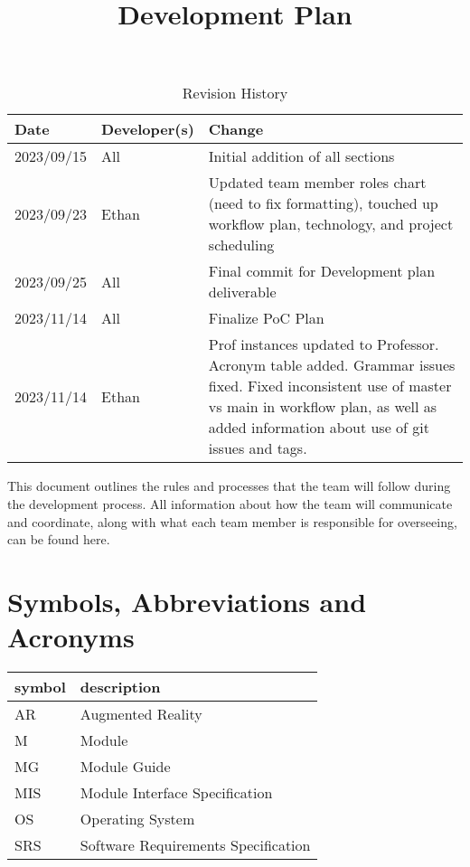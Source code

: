 \documentclass{article}
\title{Development Plan\\\progname}
\author{\authname}
\date{}
\begin{document}
\maketitle

\begin{table}[hp]
\caption{Revision History} \label{TblRevisionHistory}
\begin{tabularx}{\textwidth}{llX}
\toprule
\textbf{Date} & \textbf{Developer(s)} & \textbf{Change}\\
\midrule
2023/09/15 & All & Initial addition of all sections\\
2023/09/23 & Ethan & Updated team member roles chart (need to fix formatting), touched up workflow plan, technology, and project scheduling  \\
2023/09/25 & All & Final commit for Development plan deliverable\\
2023/11/14 & All & Finalize PoC Plan\\
2023/11/14 & Ethan & Prof instances updated to Professor. Acronym table added. Grammar issues fixed. Fixed inconsistent use of master vs main in workflow plan, as well as added information about use of git issues and tags. \\

\bottomrule
\end{tabularx}
\end{table}

This document outlines the rules and processes that the team will follow during the development process. All information about how the team will communicate and coordinate, along with what each team member is responsible for overseeing, can be found here.

\section{Symbols, Abbreviations and Acronyms}

\renewcommand{\arraystretch}{1.2}
\begin{tabular}{l l} 
  \toprule		
  \textbf{symbol} & \textbf{description}\\
  \midrule 
  AR & Augmented Reality\\
  M & Module \\
  MG & Module Guide \\
  MIS & Module Interface Specification\\
  OS & Operating System \\
  SRS & Software Requirements Specification\\
  \bottomrule
\end{tabular}\\
\end{document}
